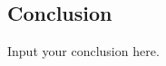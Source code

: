 \documentclass{article}
\newcounter{subsubsubsection}[subsubsection]
\begin{document}
\begin{doublespacing}



\section{Conclusion}

\noindent Input your conclusion here. 




\end{doublespacing}
\end{document}
